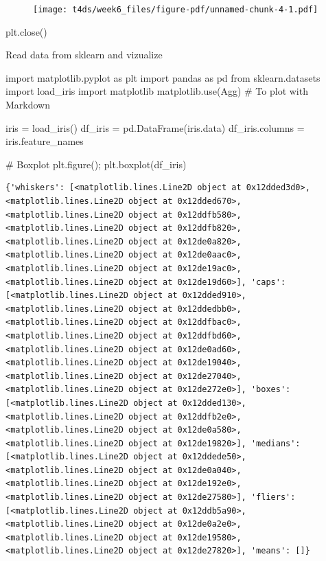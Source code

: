 \documentclass[
  letterpaper,
  DIV=11,
  numbers=noendperiod]{scrreprt}
\newenvironment{Shaded}{\begin{snugshade}}{\end{snugshade}}
\newcommand{\CommentTok}[1]{\textcolor[rgb]{0.37,0.37,0.37}{#1}}
\newcommand{\ImportTok}[1]{\textcolor[rgb]{0.00,0.46,0.62}{#1}}
\newcommand{\NormalTok}[1]{\textcolor[rgb]{0.00,0.23,0.31}{#1}}
\newcommand{\OperatorTok}[1]{\textcolor[rgb]{0.37,0.37,0.37}{#1}}
\newcommand{\StringTok}[1]{\textcolor[rgb]{0.13,0.47,0.30}{#1}}
\begin{document}
\begin{figure}[H]

{\centering \texttt{[image: t4ds/week6\_files/figure-pdf/unnamed-chunk-4-1.pdf]}

}

\end{figure}

\begin{Shaded}
\begin{Highlighting}[]
\NormalTok{plt.close()}
\end{Highlighting}
\end{Shaded}

Read data from sklearn and vizualize

\begin{Shaded}
\begin{Highlighting}[]
\ImportTok{import}\NormalTok{ matplotlib.pyplot }\ImportTok{as}\NormalTok{ plt}
\ImportTok{import}\NormalTok{ pandas }\ImportTok{as}\NormalTok{ pd}
\ImportTok{from}\NormalTok{ sklearn.datasets }\ImportTok{import}\NormalTok{ load\_iris }
\ImportTok{import}\NormalTok{ matplotlib}
\NormalTok{matplotlib.use(}\StringTok{\textquotesingle{}Agg\textquotesingle{}}\NormalTok{) }\CommentTok{\# To plot with Markdown}

\NormalTok{iris }\OperatorTok{=}\NormalTok{ load\_iris()}
\NormalTok{df\_iris }\OperatorTok{=}\NormalTok{ pd.DataFrame(iris.data)}
\NormalTok{df\_iris.columns }\OperatorTok{=}\NormalTok{ iris.feature\_names}

\CommentTok{\# Boxplot}
\NormalTok{plt.figure()}\OperatorTok{;}
\NormalTok{plt.boxplot(df\_iris)}
\end{Highlighting}
\end{Shaded}

\begin{verbatim}
{'whiskers': [<matplotlib.lines.Line2D object at 0x12dded3d0>, <matplotlib.lines.Line2D object at 0x12dded670>, <matplotlib.lines.Line2D object at 0x12ddfb580>, <matplotlib.lines.Line2D object at 0x12ddfb820>, <matplotlib.lines.Line2D object at 0x12de0a820>, <matplotlib.lines.Line2D object at 0x12de0aac0>, <matplotlib.lines.Line2D object at 0x12de19ac0>, <matplotlib.lines.Line2D object at 0x12de19d60>], 'caps': [<matplotlib.lines.Line2D object at 0x12dded910>, <matplotlib.lines.Line2D object at 0x12ddedbb0>, <matplotlib.lines.Line2D object at 0x12ddfbac0>, <matplotlib.lines.Line2D object at 0x12ddfbd60>, <matplotlib.lines.Line2D object at 0x12de0ad60>, <matplotlib.lines.Line2D object at 0x12de19040>, <matplotlib.lines.Line2D object at 0x12de27040>, <matplotlib.lines.Line2D object at 0x12de272e0>], 'boxes': [<matplotlib.lines.Line2D object at 0x12dded130>, <matplotlib.lines.Line2D object at 0x12ddfb2e0>, <matplotlib.lines.Line2D object at 0x12de0a580>, <matplotlib.lines.Line2D object at 0x12de19820>], 'medians': [<matplotlib.lines.Line2D object at 0x12ddede50>, <matplotlib.lines.Line2D object at 0x12de0a040>, <matplotlib.lines.Line2D object at 0x12de192e0>, <matplotlib.lines.Line2D object at 0x12de27580>], 'fliers': [<matplotlib.lines.Line2D object at 0x12ddb5a90>, <matplotlib.lines.Line2D object at 0x12de0a2e0>, <matplotlib.lines.Line2D object at 0x12de19580>, <matplotlib.lines.Line2D object at 0x12de27820>], 'means': []}
\end{verbatim}
\end{document}
